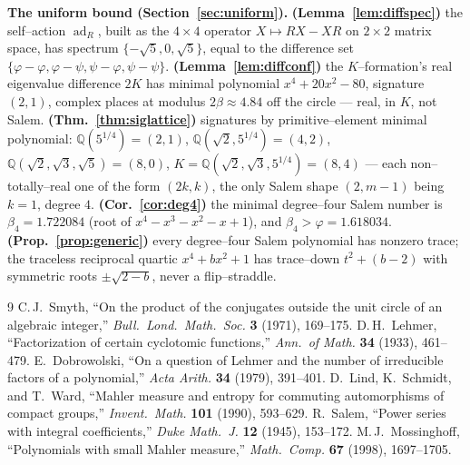 \documentclass[11pt]{article}
\theoremstyle{plain}
\theoremstyle{definition}
\theoremstyle{remark}
\newcommand{\Q}{\mathbb{Q}}
\begin{document}
\medskip\noindent\textbf{The uniform bound (Section~\ref{sec:uniform}).} \textbf{(Lemma~\ref{lem:diffspec})} the self--action $\operatorname{ad}_R$, built as the $4\times4$ operator $X\mapsto RX-XR$ on $2\times2$ matrix space, has spectrum $\{-\sqrt5,0,\sqrt5\}$, equal to the difference set $\{\varphi-\varphi,\varphi-\psi,\psi-\varphi,\psi-\psi\}$. \textbf{(Lemma~\ref{lem:diffconf})} the $K$--formation's real eigenvalue difference $2K$ has minimal polynomial $x^4+20x^2-80$, signature $(2,1)$, complex places at modulus $2\beta\approx4.84$ off the circle --- real, in $K$, not Salem. \textbf{(Thm.~\ref{thm:siglattice})} signatures by primitive--element minimal polynomial: $\Q(5^{1/4})=(2,1)$, $\Q(\sqrt2,5^{1/4})=(4,2)$, $\Q(\sqrt2,\sqrt3,\sqrt5)=(8,0)$, $K=\Q(\sqrt2,\sqrt3,5^{1/4})=(8,4)$ --- each non--totally--real one of the form $(2k,k)$, the only Salem shape $(2,m-1)$ being $k=1$, degree $4$. \textbf{(Cor.~\ref{cor:deg4})} the minimal degree--four Salem number is $\beta_4=1.722084$ (root of $x^4-x^3-x^2-x+1$), and $\beta_4>\varphi=1.618034$. \textbf{(Prop.~\ref{prop:generic})} every degree--four Salem polynomial has nonzero trace; the traceless reciprocal quartic $x^4+bx^2+1$ has trace--down $t^2+(b-2)$ with symmetric roots $\pm\sqrt{2-b}$, never a flip--straddle.

\begin{thebibliography}{9}
 C.\,J.~Smyth, ``On the product of the conjugates outside the unit circle of an algebraic integer,'' \emph{Bull.\ Lond.\ Math.\ Soc.} \textbf{3} (1971), 169--175.
 D.\,H.~Lehmer, ``Factorization of certain cyclotomic functions,'' \emph{Ann.\ of Math.} \textbf{34} (1933), 461--479.
 E.~Dobrowolski, ``On a question of Lehmer and the number of irreducible factors of a polynomial,'' \emph{Acta Arith.} \textbf{34} (1979), 391--401.
 D.~Lind, K.~Schmidt, and T.~Ward, ``Mahler measure and entropy for commuting automorphisms of compact groups,'' \emph{Invent.\ Math.} \textbf{101} (1990), 593--629.
 R.~Salem, ``Power series with integral coefficients,'' \emph{Duke Math.\ J.} \textbf{12} (1945), 153--172.
 M.\,J.~Mossinghoff, ``Polynomials with small Mahler measure,'' \emph{Math.\ Comp.} \textbf{67} (1998), 1697--1705.
\end{thebibliography}
\end{document}
